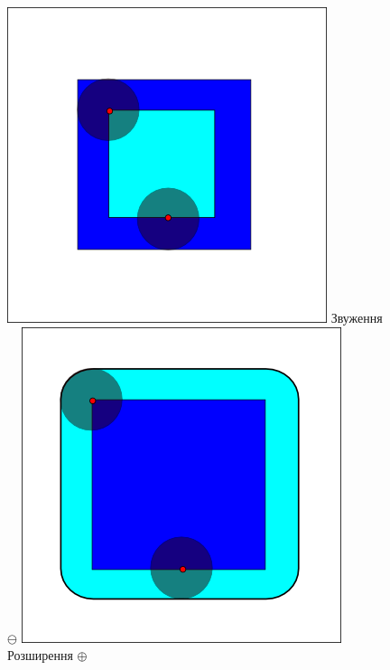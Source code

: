 \begin{figure}[t!]
	\centering
	\includegraphics[width=0.80\linewidth]{Figures/Chapter2/Erosion.png}
	Звуження \(\ominus\)
	\endminipage\hfill
	\centering	
	\includegraphics[width=0.80\linewidth]{Figures/Chapter2/Dilation.png}
	Розширення \(\oplus\)
	\endminipage\hfill
	\centering	

\end{figure}
